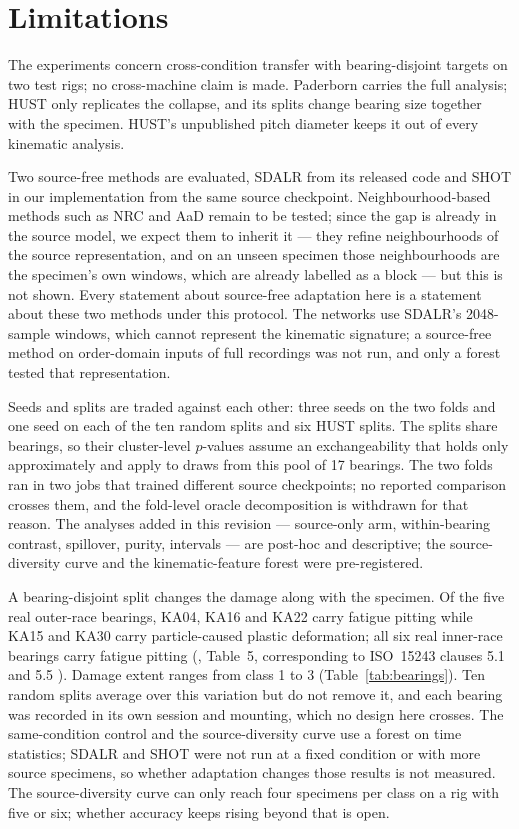 \section{Limitations}
\label{sec:limitations}

The experiments concern cross-condition transfer with bearing-disjoint targets on two test rigs; no cross-machine claim is
made. Paderborn carries the full analysis; HUST only replicates the collapse, and its splits change bearing size together
with the specimen. HUST's unpublished pitch diameter keeps it out of every kinematic analysis.

Two source-free methods are evaluated, SDALR from its released code and SHOT in our implementation from the same source
checkpoint. Neighbourhood-based methods such as NRC \cite{yang2021nrc} and AaD \cite{yang2022aad} remain to be tested; since
the gap is already in the source model, we expect them to inherit it --- they refine neighbourhoods of the source representation, and on an unseen
specimen those neighbourhoods are the specimen's own windows, which are already labelled as a block --- but this is not
shown. Every statement about
source-free adaptation here is a statement about these two methods under this protocol. The networks use SDALR's 2048-sample
windows, which cannot represent the kinematic signature; a source-free method on order-domain inputs of full recordings was
not run, and only a forest tested that representation.

Seeds and splits are traded against each other: three seeds on the two folds and one seed on each of the ten random splits and
six HUST splits. The splits share bearings, so their cluster-level $p$-values assume an exchangeability that holds only
approximately and apply to draws from this pool of 17 bearings. The two folds ran in two jobs that trained different source
checkpoints; no reported comparison crosses them, and the fold-level oracle decomposition is withdrawn for that reason. The
analyses added in this revision --- source-only arm, within-bearing contrast, spillover, purity, intervals --- are post-hoc and
descriptive; the source-diversity curve and the kinematic-feature forest were pre-registered.

A bearing-disjoint split changes the damage along with the specimen. Of the five real outer-race bearings, KA04, KA16 and KA22
carry fatigue pitting while KA15 and KA30 carry particle-caused plastic deformation; all six real inner-race bearings carry
fatigue pitting (\cite{lessmeier2016}, Table~5, corresponding to ISO~15243 clauses 5.1 and 5.5 \cite{iso15243}). Damage extent
ranges from class 1 to 3 (Table~\ref{tab:bearings}). Ten random splits average over this variation but do not remove it, and
each bearing was recorded in its own session and mounting, which no design here crosses. The same-condition control and the
source-diversity curve use a forest on time statistics; SDALR and SHOT were not run at a fixed condition or with more source
specimens, so whether adaptation changes those results is not measured. The source-diversity curve can only reach four
specimens per class on a rig with five or six; whether accuracy keeps rising beyond that is open.

